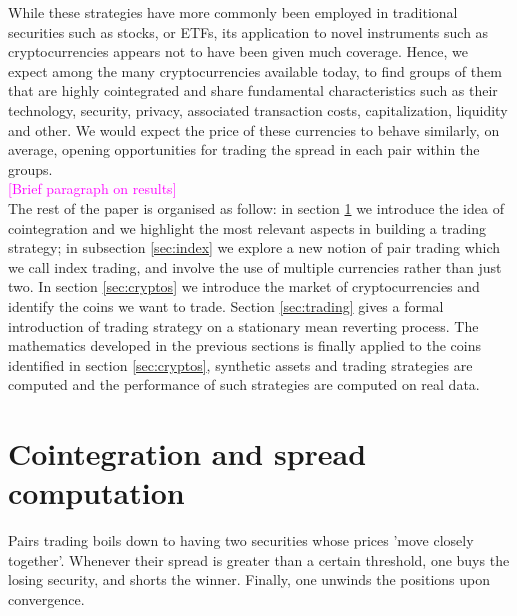 \documentclass[a4paper,11pt]{article}
\theoremstyle{remark}
\theoremstyle{plain}
\begin{document}
While these strategies have more commonly been employed in traditional securities such as stocks, or ETFs, its application to novel instruments such as cryptocurrencies appears not to have been given much coverage. Hence, we expect among the many cryptocurrencies available today, to find groups of them that are highly cointegrated and share fundamental characteristics such as their technology, security, privacy, associated transaction costs, capitalization, liquidity and other. We would expect the price of these currencies to behave similarly, on average, opening opportunities for trading the spread in each pair within the groups.\\

\textcolor{magenta}{[Brief paragraph on results]}\\

The rest of the paper is organised as follow: in section \ref{sec:cointegration} we introduce the idea of cointegration and we highlight the most relevant aspects in building a trading strategy; in subsection \ref{sec:index} we explore a new notion of pair trading which we call index trading, and involve the  use of multiple currencies rather than just two. In section \ref{sec:cryptos} we introduce the market of cryptocurrencies and identify the coins we want to trade. Section \ref{sec:trading} gives a formal introduction of trading strategy on a stationary mean reverting process. The mathematics developed in the previous sections is finally applied to the coins identified in section \ref{sec:cryptos}, synthetic assets and trading strategies are computed and the performance of such strategies are computed on real data. 

\section{Cointegration and spread computation}
\label{sec:cointegration}

Pairs trading boils down to having two securities whose prices 'move closely together'. Whenever their spread is greater than a certain threshold, one buys the losing security, and shorts the winner. Finally, one unwinds the positions upon convergence. 
\end{document}
